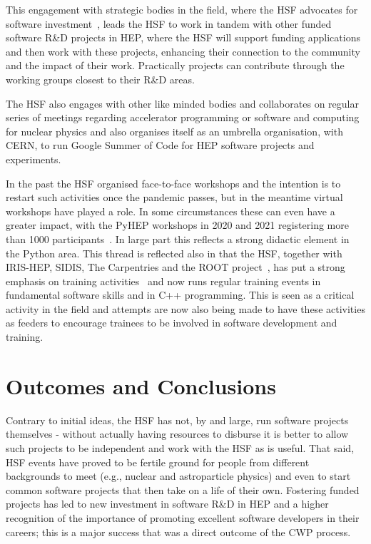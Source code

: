 \documentclass{article}
\begin{document}
This engagement with strategic bodies in the field, where the HSF
advocates for software investment~\cite{stewart_graeme_a_2018_2413005}, leads the HSF to
work in tandem with other funded software R\&D projects in HEP, where
the HSF will support funding applications and then work with these
projects, enhancing their connection to the community and the impact of
their work. Practically projects can contribute through the working
groups closest to their R\&D areas.

The HSF also engages with other like minded bodies and collaborates on
regular series of meetings regarding accelerator programming or software
and computing for nuclear physics and also organises itself as an
umbrella organisation, with CERN, to run Google Summer of Code for HEP
software projects and experiments.

In the past the HSF organised face-to-face workshops and the intention
is to restart such activities once the pandemic passes, but in the
meantime virtual workshops have played a role. In some circumstances
these can even have a greater impact, with the PyHEP workshops in 2020
and 2021 registering more than 1000 participants~\cite{PYHEP20,PYHEP21}.
In large part this reflects a strong didactic element in the Python
area. This thread is reflected also in that the HSF, together with
IRIS-HEP, SIDIS, The Carpentries and the ROOT project~\cite{IRIS-HEP,SIDIS,CARPENTRIES,Brun1996,ROOT}, has put a strong emphasis on training
activities~\cite{Malik2021} and now runs regular training events in
fundamental software skills and in C++ programming. This is seen as a
critical activity in the field and attempts are now also being made to
have these activities as feeders to encourage trainees to be involved in
software development and training.

\hypertarget{outcomes-and-conclusions}{%
\section{Outcomes and
Conclusions}\label{outcomes-and-conclusions}}

Contrary to initial ideas, the HSF has not, by and large, run software
projects themselves - without actually having resources to disburse it
is better to allow such projects to be independent and work with the HSF
as is useful. That said, HSF events have proved to be fertile ground for
people from different backgrounds to meet (e.g., nuclear and
astroparticle physics) and even to start common software projects that
then take on a life of their own. Fostering funded projects has led to
new investment in software R\&D in HEP and a higher recognition of the
importance of promoting excellent software developers in their careers;
this is a major success that was a direct outcome of the CWP process.
\end{document}
